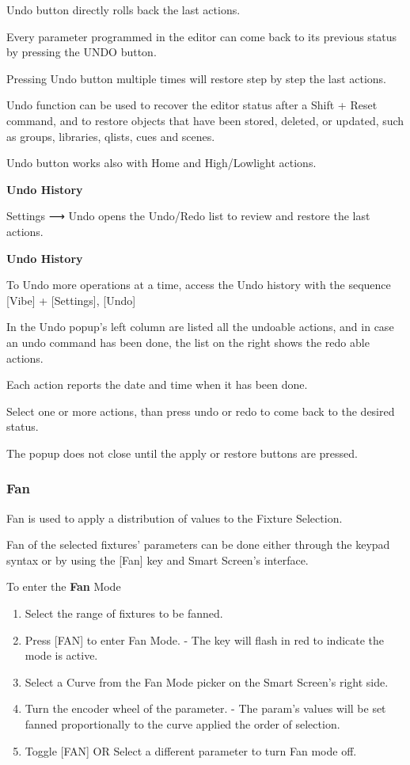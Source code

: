 \documentclass[
]{article}
\begin{document}
Undo button directly rolls back the last actions.

Every parameter programmed in the editor can come back to its previous status by pressing the UNDO button.

Pressing Undo button multiple times will restore step by step the last actions.

Undo function can be used to recover the editor status after a Shift + Reset command, and to restore objects that have been stored, deleted, or updated, such as groups, libraries, qlists, cues and scenes.

Undo button works also with Home and High/Lowlight actions.

\textbf{Undo History}

Settings ⟶ Undo opens the Undo/Redo list to review and restore the last actions.

\textbf{Undo History}

To Undo more operations at a time, access the Undo history with the sequence {[}Vibe{]} + {[}Settings{]}, {[}Undo{]}

In the Undo popup's left column are listed all the undoable actions, and in case an undo command has been done, the list on the right shows the redo able actions.

Each action reports the date and time when it has been done.

Select one or more actions, than press undo or redo to come back to the desired status.

The popup does not close until the apply or restore buttons are pressed.

\hypertarget{fan}{%
\subsubsection{Fan}\label{fan}}

Fan is used to apply a distribution of values to the Fixture Selection.

Fan of the selected fixtures' parameters can be done either through the keypad syntax or by using the {[}Fan{]} key and Smart Screen's interface.

To enter the \textbf{Fan} Mode

\begin{enumerate}
\def\labelenumi{\arabic{enumi}.}
\item
  Select the range of fixtures to be fanned.
\item
  Press {[}FAN{]} to enter Fan Mode. - The key will flash in {red} to indicate the mode is active.
\item
  Select a Curve from the Fan Mode picker on the Smart Screen's right side.
\item
  Turn the encoder wheel of the parameter. - The param's values will be set fanned proportionally to the curve applied the order of selection.
\item
  Toggle {[}FAN{]} OR Select a different parameter to turn Fan mode off.
\end{enumerate}
\end{document}
